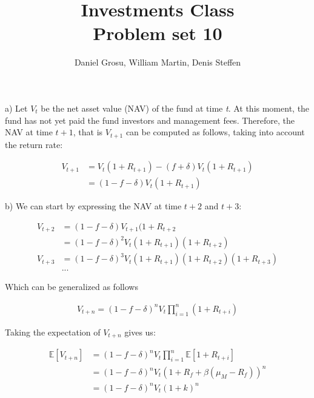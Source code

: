 \documentclass[10pt]{article}
\newenvironment{exercise}[2][Exercise]{\begin{trivlist}
  \item[\hskip \labelsep {\bfseries #1}\hskip \labelsep {\bfseries #2.}]}{\end{trivlist}}
\begin{document}
  \pagecolor{solar}
	
  \renewcommand{\qedsymbol}{\smiley}
	\title{Investments Class \\ Problem set 10}
	\author{Daniel Grosu, William Martin, Denis Steffen}
		
\maketitle

\begin{exercise}{1. Fund performance and fees}
\end{exercise}

\newpage

\begin{exercise}{2. Closed-end funds}
\end{exercise}

a) Let $V_t$ be the net asset value (NAV) of the fund at time \textit{t}. At this moment, the fund has not yet paid the fund investors and management fees. Therefore, the NAV at time $t+1$, that is $V_{t+1}$ can be computed as follows, taking into account the return rate:

\begin{align*}
	V_{t+1} &= V_t(1 + R_{t+1}) - (f + \delta)V_t(1 + R_{t+1})\\
	&= (1 - f - \delta)V_t(1 + R_{t+1})
\end{align*}

b) We can start by expressing the NAV at time $t+2$ and $t+3$:

\begin{align*}
	V_{t+2} &= (1-f-\delta)V_{t+1}(1 + R_{t+2}\\
	&= (1-f-\delta)^2V_t(1 + R_{t+1})(1 + R_{t+2})\\
	V_{t+3} &= (1-f-\delta)^3 V_t (1+R_{t+1})(1+R_{t+2})(1+R_{t+3})\\
	&...
\end{align*}

Which can be generalized as follows

\begin{align*}
	V_{t+n} = (1-f-\delta)^n V_t \prod^n_{i=1}(1 + R_{t+i})
\end{align*}

Taking the expectation of $V_{t+n}$ gives us:

\begin{align*}
	\mathbb{E}[V_{t+n}] &= (1 - f - \delta)^n V_t \prod^n_{i=1} \mathbb{E}[1 + R_{t+i}]\\
	&= (1 - f - \delta)^n V_t \left(1 + R_f +\beta (\mu_M - R_f)\right)^n\\
	&= (1 - f - \delta)^n V_t (1 + k)^n
\end{align*}
\end{document}
